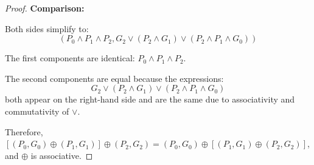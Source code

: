 \documentclass[a4paper]{article}
\begin{document}
\begin{proof}
\textbf{Comparison:}

Both sides simplify to:
$$(P_0 \land P_1 \land P_2, G_2 \lor (P_2 \land G_1) \lor (P_2 \land P_1 \land G_0))$$

The first components are identical: $P_0 \land P_1 \land P_2$.

The second components are equal because the expressions:
$$G_2 \lor (P_2 \land G_1) \lor (P_2 \land P_1 \land G_0)$$
both appear on the right-hand side and are the same due to associativity and commutativity of $\lor$.

Therefore, $[(P_0, G_0) \oplus (P_1, G_1)] \oplus (P_2, G_2) = (P_0, G_0) \oplus [(P_1, G_1) \oplus (P_2, G_2)]$, and $\oplus$ is associative.
\end{proof}
\end{document}
